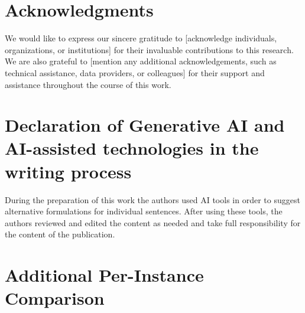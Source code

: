 \documentclass[3p,11pt,authoryear]{elsarticle}  %
\begin{document}

\section*{Acknowledgments}

We would like to express our sincere gratitude to [acknowledge individuals, organizations, or institutions] for their invaluable contributions to this research. We are also grateful to [mention any additional acknowledgements, such as technical assistance, data providers, or colleagues] for their support and assistance throughout the course of this work.

\section*{Declaration of Generative AI and AI-assisted technologies in the writing process}

During the preparation of this work the authors used AI tools in order to suggest alternative formulations for individual sentences. After using these tools, the authors reviewed and edited the content as needed and take full responsibility for the content of the publication.





\appendix

\section{Additional Per-Instance Comparison}
\label{appendix:diagnostics}
\end{document}
